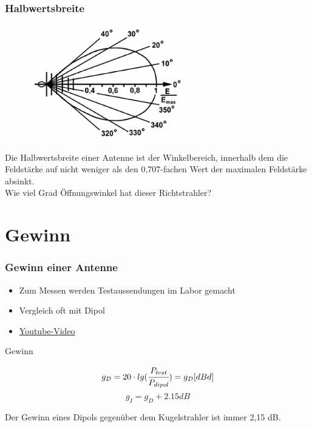 \begin{frame}
  \frametitle{Halbwertsbreite}
  \begin{center}
    \begin{figure}
      \includegraphics[width=0.6\textwidth,height=.5\textheight,keepaspectratio]{a09/TH213.png}
    \end{figure}
    \large Die Halbwertsbreite einer Antenne ist der Winkelbereich, innerhalb dem
    die Feldstärke auf nicht weniger als den 0,707-fachen Wert der maximalen Feldstärke absinkt.\\[1em] Wie viel Grad Öffnungswinkel hat dieser Richtstrahler?
  \end{center}
\end{frame}

\section*{Gewinn}

\begin{frame}
  \frametitle{Gewinn einer Antenne}
  \begin{itemize}
    \item Zum Messen werden Testaussendungen im Labor gemacht
    \item Vergleich oft mit Dipol
    \item \href{https://www.youtube.com/watch?v=gBqqp7rnZ64}{\ExternalLink Youtube-Video}\\[2em]
  \end{itemize}
  \begin{block}{Gewinn}
    \begin{center}
      $$g_D = 20 \cdot lg(\cfrac{P_{test}}{P_{dipol}}) = g_D[dBd]$$
      $$g_I = g_D + 2.15dB$$
    \end{center}
    Der Gewinn eines Dipols gegenüber dem Kugelstrahler ist immer 2,15 dB.
  \end{block}
\end{frame}

